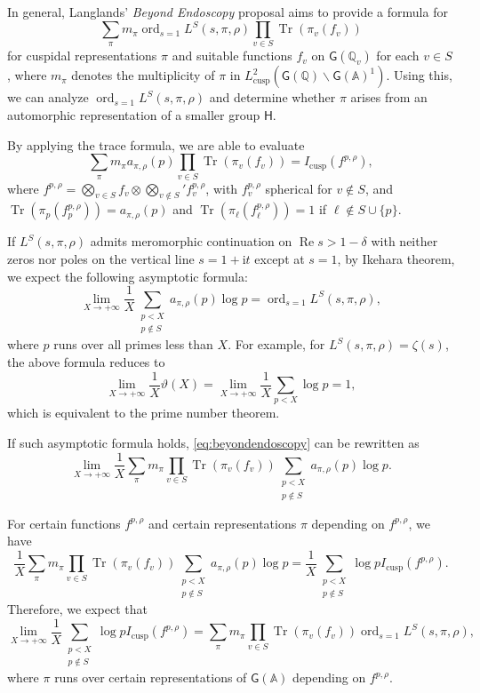 \documentclass[10pt,oneside,reqno]{amsart}
\newcommand\rmi{\mathrm{i}}
\renewcommand\AA{\mathbb{A}}
\newcommand\QQ{\mathbb{Q}}
\newcommand\G{\mathsf{G}}
\renewcommand\H{\mathsf{H}}
\newcommand\bs{\backslash}
\renewcommand\Re{\mathop{\mathrm{Re}}}
\DeclareMathOperator\Tr{Tr}
\DeclareMathOperator\ord{ord}
\theoremstyle{THEOREM}
\theoremstyle{DEFINITION}
\theoremstyle{EXERCISE}
\numberwithin{equation}{section}
\begin{document}
In general, Langlands' \emph{Beyond Endoscopy} proposal \cite{langlands2004} aims to provide a formula for
\begin{equation}\label{eq:beyondendoscopy}
\sum_{\pi}m_{\pi}\ord_{s=1}L^{S}(s,\pi,\rho)\prod_{v\in S}\Tr(\pi_v(f_v))
\end{equation}
for cuspidal representations $\pi$ and suitable functions $f_v$ on $\G(\QQ_v)$ for each $v\in S$, where $m_\pi$ denotes the multiplicity of $\pi$ in $L^2_{\mathrm{cusp}}(\G(\QQ)\bs \G(\AA)^1)$. Using this, we can analyze $\ord_{s=1}L^S(s,\pi,\rho)$ and determine whether $\pi$ arises from an automorphic representation of a smaller group $\H$.

By applying the trace formula, we are able to evaluate
\[
\sum_{\pi}m_\pi a_{\pi,\rho}(p)\prod_{v\in S}\Tr(\pi_v(f_v))=I_{\mathrm{cusp}}(f^{p,\rho}),
\]
where $f^{p,\rho}=\bigotimes_{v\in S}f_v\otimes\bigotimes_{v\notin S}'f_v^{p,\rho}$, with $f_v^{p,\rho}$ spherical for $v\notin S$, and $\Tr(\pi_p(f_p^{p,\rho}))=a_{\pi,\rho}(p)$ and $\Tr(\pi_\ell(f_\ell^{p,\rho}))=1$ if $\ell\notin S\cup\{p\}$.

If $L^S(s,\pi,\rho)$ admits meromorphic continuation on $\Re s>1-\delta$ with neither zeros nor poles on the vertical line $s=1+\rmi t$ except at $s=1$, by Ikehara theorem, we expect the following asymptotic formula:
\[
\lim_{X\to +\infty}\frac{1}{X}\sum_{\substack{p<X\\ p\notin S}}a_{\pi,\rho}(p)\log p=\ord_{s=1}L^S(s,\pi,\rho),
\]
where $p$ runs over all primes less than $X$.
For example, for $L^S(s,\pi,\rho)=\zeta(s)$, the above formula reduces to
\[
\lim_{X\to +\infty}\frac{1}{X}\vartheta(X)=\lim_{X\to +\infty}\frac{1}{X}\sum_{p<X}\log p =1,
\]
which is equivalent to the prime number theorem.

If such asymptotic formula holds, \eqref{eq:beyondendoscopy} can be rewritten as
\[
\lim_{X\to +\infty}\frac{1}{X}\sum_{\pi}m_\pi\prod_{v\in S}\Tr(\pi_v(f_v))\sum_{\substack{p<X\\ p \notin S}}a_{\pi,\rho}(p)\log p .
\] 

For certain functions $f^{p,\rho}$ and certain representations $\pi$ depending on $f^{p,\rho}$, we have
\[
\frac{1}{X}\sum_{\pi}m_\pi\prod_{v\in S}\Tr(\pi_v(f_v))\sum_{\substack{p<X\\ p \notin S}}a_{\pi,\rho}(p)\log p 
=\frac{1}{X}\sum_{\substack{p<X\\ p \notin S}}\log pI_{\mathrm{cusp}}(f^{p,\rho}).
\] 
Therefore, we expect that 
\[
\lim_{X\to +\infty}\frac{1}{X}\sum_{\substack{p<X\\ p \notin S}}\log pI_{\mathrm{cusp}}(f^{p,\rho})=\sum_{\pi}m_\pi \prod_{v\in S}\Tr(\pi_v(f_v))\ord_{s=1}L^S(s,\pi,\rho),
\]
where $\pi$ runs over certain representations of $\G(\AA)$ depending on $f^{p,\rho}$. 
\end{document}
